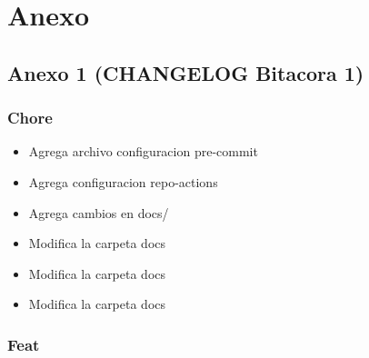 \documentclass[
  letterpaper,
  DIV=11,
  numbers=noendperiod]{scrreprt}
\providecommand{\tightlist}{%
  \setlength{\itemsep}{0pt}\setlength{\parskip}{0pt}}\usepackage{longtable,booktabs,array}
\begin{document}

\chapter{Anexo}\label{anexo}

\section{Anexo 1 (CHANGELOG Bitacora
1)}\label{anexo-1-changelog-bitacora-1}

\subsection{Chore}\label{chore}

\begin{itemize}
\tightlist
\item
  Agrega archivo configuracion pre-commit
\item
  Agrega configuracion repo-actions
\item
  Agrega cambios en docs/
\item
  Modifica la carpeta docs
\item
  Modifica la carpeta docs
\item
  Modifica la carpeta docs
\end{itemize}

\subsection{Feat}\label{feat}
\end{document}

